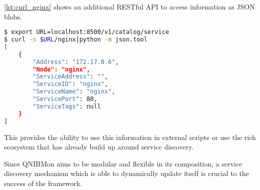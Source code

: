 \autoref{lst:curl_nginx} shows an additional RESTful API to access information as JSON blobs.

\begin{lstlisting}[language=bash,
    caption={Exposure of services via RESTful API.},
    label={lst:curl_nginx}]
$ export URL=localhost:8500/v1/catalog/service
$ curl -s $URL/nginx|python -m json.tool
[
    {
        "Address": "172.17.0.6",
        "Node": "nginx",
        "ServiceAddress": "",
        "ServiceID": "nginx",
        "ServiceName": "nginx",
        "ServicePort": 80,
        "ServiceTags": null
    }
]
\end{lstlisting}
This provides the ability to use this information in external scripts or use the rich ecosystem that has already build up around service discovery.

Since QNIBMon aims to be modular and flexible in its composition, a service discovery mechanism which is able to dynamically update itself is crucial to the success of the framework.